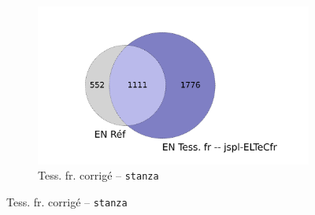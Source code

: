 \begin{figure}[h!]
  \begin{minipage}{7cm}
  \begin{subfigure}{1\textwidth}
  \includegraphics[width=1\textwidth]{IMAGES/INTERSECTIONS_GLOBALES/ELTeCFRA_Tess. fr -- jspl-ELTeCfr_stanza-concat_intersection.png}
  \caption{Tess. fr. corrigé -- \texttt{stanza}}
  \label{fig:ELTeCFRA_Tess. fr -- jspl-ELTeCfr_stanza-concat_intersection}

\end{subfigure}
\end{minipage}
\end{figure}
